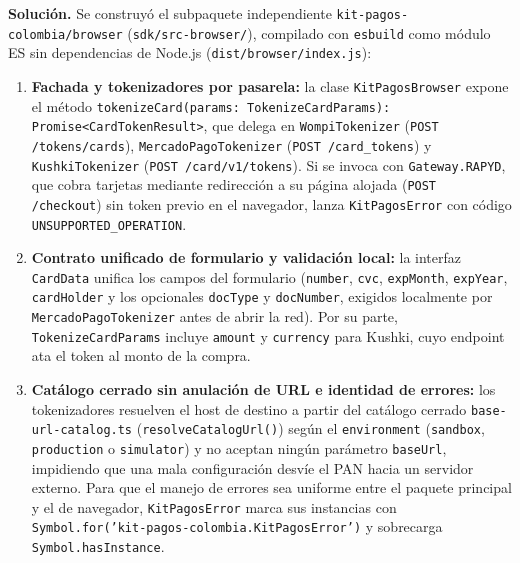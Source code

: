 \textbf{Solución.} Se construyó el subpaquete independiente \texttt{kit-pagos-colombia/browser} (\texttt{sdk/src-browser/}), compilado con \texttt{esbuild} como módulo ES sin dependencias de Node.js (\texttt{dist/browser/index.js}):
\begin{enumerate}
  \item \textbf{Fachada y tokenizadores por pasarela:} la clase \texttt{KitPagosBrowser} expone el método \texttt{tokenizeCard(\allowbreak{}params: TokenizeCardParams): Promise<\allowbreak{}CardTokenResult>}, que delega en \texttt{WompiTokenizer} (\texttt{POST /\allowbreak{}tokens/\allowbreak{}cards}), \texttt{MercadoPagoTokenizer} (\texttt{POST /\allowbreak{}card\_\allowbreak{}tokens}) y \texttt{KushkiTokenizer} (\texttt{POST /\allowbreak{}card/\allowbreak{}v1/\allowbreak{}tokens}). Si se invoca con \texttt{Gateway.RAPYD}, que cobra tarjetas mediante redirección a su página alojada (\texttt{POST /\allowbreak{}checkout}) sin token previo en el navegador, lanza \texttt{KitPagosError} con código \texttt{UNSUPPORTED\_\allowbreak{}OPERATION}.
  \item \textbf{Contrato unificado de formulario y validación local:} la interfaz \texttt{CardData} unifica los campos del formulario (\texttt{number}, \texttt{cvc}, \texttt{expMonth}, \texttt{expYear}, \texttt{cardHolder} y los opcionales \texttt{docType} y \texttt{docNumber}, exigidos localmente por \texttt{MercadoPagoTokenizer} antes de abrir la red). Por su parte, \texttt{TokenizeCardParams} incluye \texttt{amount} y \texttt{currency} para Kushki, cuyo endpoint ata el token al monto de la compra.
  \item \textbf{Catálogo cerrado sin anulación de URL e identidad de errores:} los tokenizadores resuelven el host de destino a partir del catálogo cerrado \texttt{base-url-catalog.ts} (\texttt{resolveCatalogUrl()}) según el \texttt{environment} (\texttt{sandbox}, \texttt{production} o \texttt{simulator}) y no aceptan ningún parámetro \texttt{baseUrl}, impidiendo que una mala configuración desvíe el PAN hacia un servidor externo. Para que el manejo de errores sea uniforme entre el paquete principal y el de navegador, \texttt{KitPagosError} marca sus instancias con \texttt{Symbol.for('kit-pagos-colombia.KitPagosError')} y sobrecarga \texttt{Symbol.hasInstance}.
\end{enumerate}

